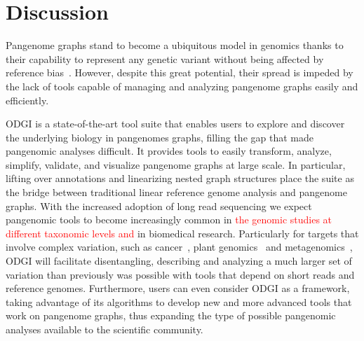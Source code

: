 \documentclass{bioinfo}
\newcommand{\REVIEWED}[1]{{\textcolor{Red}{#1}}}
\begin{document}


%

%




\section{Discussion}
Pangenome graphs stand to become a ubiquitous model in genomics thanks to their capability to represent any genetic variant without being affected by reference bias~\citep{Eizenga_2020}.
However, despite this great potential, their spread is impeded by the lack of tools capable of managing and analyzing pangenome graphs easily and efficiently.

ODGI is a state-of-the-art tool suite that enables users to explore and discover the underlying biology in pangenomes graphs, filling the gap that made pangenomic analyses difficult.
It provides tools to easily transform, analyze, simplify, validate, and visualize pangenome graphs at large scale.
In particular, lifting over annotations and linearizing nested graph structures place the suite as the bridge between traditional linear reference genome analysis and pangenome graphs.
With the increased adoption of long read sequencing we expect pangenomic tools to become increasingly common in \REVIEWED{the genomic studies at different taxonomic levels and} in biomedical research.
Particularly for targets that involve complex variation, such as cancer\REVIEWED{~\citep{CompPan2016}}, plant genomics\REVIEWED{~\citep{Bayer2020}} and metagenomics\REVIEWED{~\citep{Zhong2021}}, ODGI will facilitate disentangling,
describing and analyzing a much larger set of variation than previously was possible with tools that depend on short reads and reference genomes.
Furthermore, users can even consider ODGI as a framework, taking advantage of its algorithms to develop new and more advanced tools that work on pangenome graphs,
thus expanding the type of possible pangenomic analyses available to the scientific community.
\end{document}

